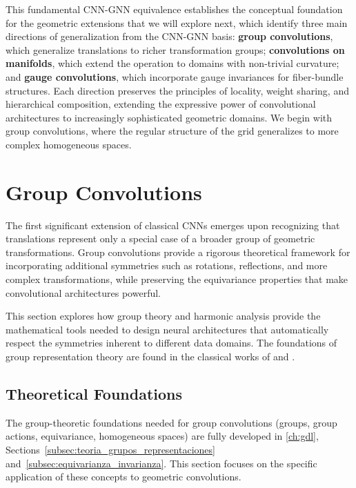 This fundamental CNN-GNN equivalence establishes the conceptual foundation for the geometric extensions that we will explore next, which identify three main directions of generalization from the CNN-GNN basis: \textbf{group convolutions}, which generalize translations to richer transformation groups; \textbf{convolutions on manifolds}, which extend the operation to domains with non-trivial curvature; and \textbf{gauge convolutions}, which incorporate gauge invariances for fiber-bundle structures. Each direction preserves the principles of locality, weight sharing, and hierarchical composition, extending the expressive power of convolutional architectures to increasingly sophisticated geometric domains. We begin with group convolutions, where the regular structure of the grid generalizes to more complex homogeneous spaces.

\section{Group Convolutions}\label{sec:group_convolutions}

The first significant extension of classical \glspl{CNN} emerges upon recognizing that translations represent only a special case of a broader group of geometric transformations. Group convolutions provide a rigorous theoretical framework for incorporating additional symmetries such as rotations, reflections, and more complex transformations, while preserving the equivariance properties that make convolutional architectures powerful.

This section explores how group theory and harmonic analysis provide the mathematical tools needed to design neural architectures that automatically respect the symmetries inherent to different data domains. The foundations of group representation theory are found in the classical works of \citet{Peter1927} and \citet{Serre1977}.

\subsection{Theoretical Foundations}\label{subsec:fundamentos_teoricos}

The group-theoretic foundations needed for group convolutions (groups, group actions, equivariance, homogeneous spaces) are fully developed in \autoref{ch:gdl}, Sections~\ref{subsec:teoria_grupos_representaciones} and~\ref{subsec:equivarianza_invarianza}. This section focuses on the specific application of these concepts to geometric convolutions.

